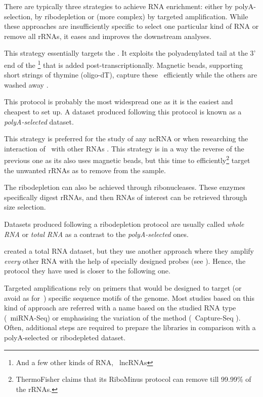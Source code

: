 There are typically three strategies to achieve \gls{RNA} enrichment:
either by polyA-selection, by ribodepletion or (more complex)
by targeted amplification. While these
approaches are insufficiently specific to select one particular kind of \gls{RNA}
or remove all \glspl{rRNA}, it eases and improves the downstream analyses.

\label{msec:polyA}
This strategy essentially targets the \mRNAs. It exploits the polyadenylated
tail at the 3' end of the \mRNAs\footnote{And a few other kinds of \gls{RNA},
\eg\ \glspl{lncRNA} } that is added
post-transcriptionally.
Magnetic beads, supporting short strings of thymine (oligo-dT),
capture these \mRNAs\ efficiently while the others
are washed away .

This protocol is probably the most widespread one as it is the easiest and
cheapest to set up. A dataset produced following this protocol is known as
a \emph{polyA-selected} dataset.

This strategy is preferred for the study of any \gls{ncRNA} or when researching
the interaction of \mRNAs\ with other \glspl{RNA} . This
strategy is in a way the reverse of the previous one as its also
uses magnetic beads, but this time to efficiently\footnote{ThermoFisher claims
that its RiboMinus protocol can remove till 99.99\% of the \glspl{rRNA}.}
target the unwanted \glspl{rRNA} as to remove from the sample.

The ribodepletion can also be achieved through ribonucleases. These enzymes
specifically digest \glspl{rRNA}, and then \glspl{RNA} of interest can be retrieved
through size selection.

Datasets produced following a ribodepletion protocol are usually called
\emph{whole \gls{RNA}} or \emph{total \gls{RNA}} as a contrast to the
\emph{polyA-selected} ones.

\citet{castleData} created a total \gls{RNA} dataset, but they use another
approach where they amplify \emph{every} other \gls{RNA} with the help of
specially designed probes (see ). Hence,
the protocol they have used is closer to the following one.

Targeted amplifications rely on primers that would be designed to target (or
avoid as for~\citet{castleData}) specific sequence motifs of the genome.
Most studies based on this kind of approach are referred with
a name based on the studied \gls{RNA} type (\eg\ \gls{miRNA-Seq}) or
emphasising the variation of the method (\eg\ Capture-Seq
).
Often,  additional steps are required to prepare the libraries
in comparison with a polyA-selected or ribodepleted dataset.

